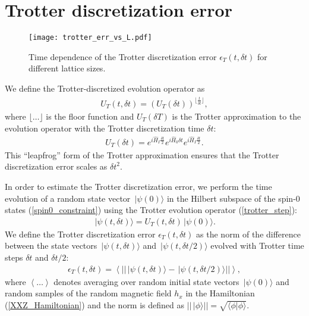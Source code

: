 \documentclass[10pt,amsmath,amssymb,twocolumn,superscriptaddress,groupedaddress,nofootinbib,aps,prd,twocolumn]{revtex4-2}
\newcommand{\lr}[1]{\left(#1\right)}
\newcommand{\vev}[1]{\left\langle #1 \right\rangle}
\newcommand{\ket}[1]{ \, | #1 \rangle }
\newcommand{\braket}[2]{ \langle #1 | #2 \rangle }
\newcommand{\floor}[1]{\lfloor #1 \rfloor}
\begin{document}
\section{Trotter discretization error}
\label{sec:trotter_err}

\begin{figure*}[h!pb]
  \centering
  \texttt{[image: trotter\_err\_vs\_L.pdf]}\\
  \caption{Time dependence of the Trotter discretization error $\epsilon_T\lr{t, {\delta t}}$ for different lattice sizes.}
  \label{fig:trotter_err_vs_L}
\end{figure*}

We define the Trotter-discretized evolution operator as
\begin{eqnarray}
\label{trotter_evolution}
 U_T\lr{t, {\delta t}} = \lr{U_T\lr{\delta t}}^{\floor{\frac{t}{\delta t}}} ,
\end{eqnarray}
where $\floor{\ldots}$ is the floor function and $U_T\lr{\delta T}$ is the Trotter approximation to the evolution operator with the Trotter discretization time $\delta t$:
\begin{eqnarray}
\label{trotter_step}
 U_T\lr{\delta t} = e^{i \hat{H}_I \frac{\delta t}{2} } e^{i \hat{H}_0 {\delta t}} e^{i \hat{H}_I \frac{\delta t}{2} } .
\end{eqnarray}
This ``leapfrog'' form of the Trotter approximation ensures that the Trotter discretization error scales as ${\delta t}^2$.

In order to estimate the Trotter discretization error, we perform the time evolution of a random state vector $\ket{\psi\lr{0}}$ in the Hilbert subspace of the spin-0 states (\ref{spin0_constraint}) using the Trotter evolution operator (\ref{trotter_step}):
\begin{eqnarray}
\label{trotter_state_evolution}
 \ket{\psi\lr{t, {\delta t}}} = U_T\lr{t, {\delta t}} \ket{\psi\lr{0}} .
\end{eqnarray}
We define the Trotter discretization error $\epsilon_T\lr{t, {\delta t}}$ as the norm of the difference between the state vectors $\ket{\psi\lr{t, {\delta t}}}$ and $\ket{\psi\lr{t, {\delta t}/2}}$ evolved with Trotter time steps ${\delta t}$ and ${\delta t}/2$:
\begin{eqnarray}
\label{trotter_err_def}
 \epsilon_T\lr{t, {\delta t}} = \vev{|| \ket{\psi\lr{t, {\delta t}}} - \ket{\psi\lr{t, {\delta t}/2}} || } ,
\end{eqnarray}
where $\vev{\ldots}$ denotes averaging over random initial state vectors $\ket{\psi\lr{0}}$ and random samples of the random magnetic field $h_x$ in the Hamiltonian (\ref{XXZ_Hamiltonian}) and the norm is defined as $|| \ket{\phi} || = \sqrt{\braket{\phi}{\phi}}$.
\end{document}

